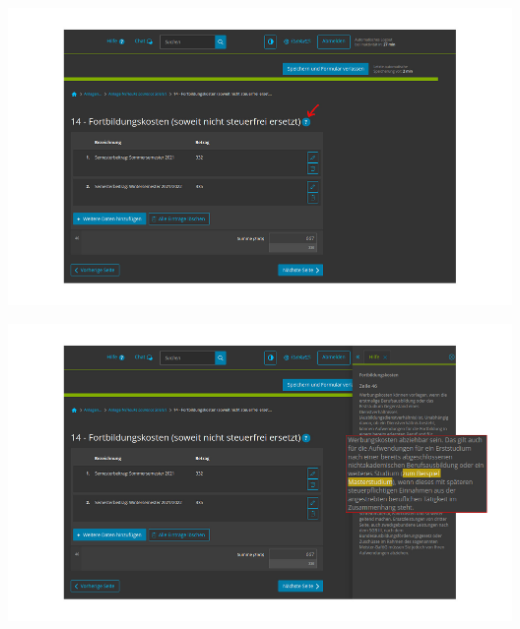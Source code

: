 \documentclass[draft]{beamer}
\begin{document}
			\begin{frame}
				\begin{center}
					\vspace{-0.6cm}
					\hspace*{-0.91cm}
					\includegraphics[scale=0.24]{images/elster-fortbildungskosten-1}
				\end{center}
			\end{frame}
			
			\begin{frame}
				\begin{center}
					\vspace{-0.6cm}
					\hspace*{-0.91cm}
					\includegraphics[scale=0.24]{images/elster-fortbildungskosten-2}
				\end{center}
			\end{frame}
			
\end{document}
